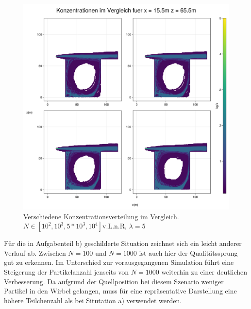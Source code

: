 \documentclass[ngerman]{scrartcl}
\begin{document}
\begin{figure}[H]
	\centering
	\includegraphics[scale=0.25]{Bilder/3_vergleich_x = 15.5.png}
	\caption{ Verschiedene Konzentrationsverteilung im Vergleich. $N \in[10^2,10^3,5 *10^3,10^4]$v.L.n.R, $\lambda =5$}
	\label{fig:my_label}
\end{figure}
Für die in Aufgabenteil b) geschilderte Situation zeichnet sich ein leicht anderer Verlauf ab. Zwischen $N=100$ und $N=1000$ ist auch hier der Qualitätssprung gut zu erkennen. Im Unterschied zur vorausgegangenen Simulation führt eine Steigerung der Partikelanzahl jenseits von $N=1000$ weiterhin zu einer deutlichen Verbesserung. Da aufgrund der Quellposition bei diesem Szenario weniger Partikel in den Wirbel gelangen, muss für eine repräsentative Darstellung eine höhere Teilchenzahl als bei Situtation a) verwendet werden.
\end{document}
